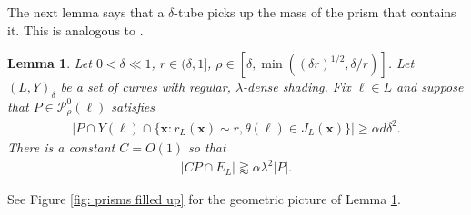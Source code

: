 \documentclass[12pt]{amsart}
\newcommand{\x}{{\bf{x}}}
\numberwithin{equation}{section}
\newtheorem{lemma}{Lemma}[section]
\newcommand{\1}{\mathbbm{1}}
\renewcommand{\x}{\mathbf x}
\begin{document}
The next lemma says that a $\delta$-tube picks up the mass of the prism that contains it. This is analogous to \cite[Lemma 2.10]{KWZ}.
\begin{lemma}\label{lem: prism filled up}
    Let $0 < \delta \ll 1$, $r \in (\delta, 1]$, $\rho \in [\delta, \min((\delta r)^{1/2}, \delta / r)]$. Let $(L,Y)_{\delta}$ be a set of curves with regular, $\lambda$-dense shading. Fix $\ell \in L$ and suppose that $P \in \mathcal P_\rho^0(\ell)$ satisfies 
    \begin{align}\label{eq: prism filled up hypothesis}
        |P \cap Y(\ell) \cap \{\x : r_L(\x) \sim r, \theta(\ell) \in J_L(\x)\}| \geq \alpha d \delta^2. 
    \end{align}
    There is a constant $C = O(1)$ so that 
    \begin{align}
        |CP \cap E_L| \gtrapprox \alpha \lambda^2 |P|. 
    \end{align}
\end{lemma}
See Figure \ref{fig: prisms filled up} for the geometric picture of Lemma \ref{lem: prism filled up}.
\end{document}
